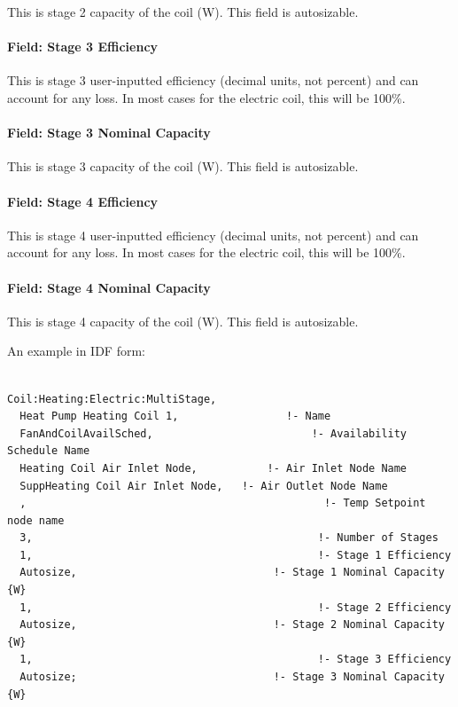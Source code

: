 This is stage 2 capacity of the coil (W). This field is autosizable.

\paragraph{Field: Stage 3 Efficiency}\label{field-stage-3-efficiency}

This is stage 3 user-inputted efficiency (decimal units, not percent) and can account for any loss. In most cases for the electric coil, this will be 100\%.

\paragraph{Field: Stage 3 Nominal Capacity}\label{field-stage-3-nominal-capacity}

This is stage 3 capacity of the coil (W). This field is autosizable.

\paragraph{Field: Stage 4 Efficiency}\label{field-stage-4-efficiency}

This is stage 4 user-inputted efficiency (decimal units, not percent) and can account for any loss. In most cases for the electric coil, this will be 100\%.

\paragraph{Field: Stage 4 Nominal Capacity}\label{field-stage-4-nominal-capacity}

This is stage 4 capacity of the coil (W). This field is autosizable.

An example in IDF form:

\begin{lstlisting}

Coil:Heating:Electric:MultiStage,
  Heat Pump Heating Coil 1,                 !- Name
  FanAndCoilAvailSched,                         !- Availability Schedule Name
  Heating Coil Air Inlet Node,           !- Air Inlet Node Name
  SuppHeating Coil Air Inlet Node,   !- Air Outlet Node Name
  ,                                               !- Temp Setpoint node name
  3,                                             !- Number of Stages
  1,                                             !- Stage 1 Efficiency
  Autosize,                               !- Stage 1 Nominal Capacity {W}
  1,                                             !- Stage 2 Efficiency
  Autosize,                               !- Stage 2 Nominal Capacity {W}
  1,                                             !- Stage 3 Efficiency
  Autosize;                               !- Stage 3 Nominal Capacity {W}
\end{lstlisting}

